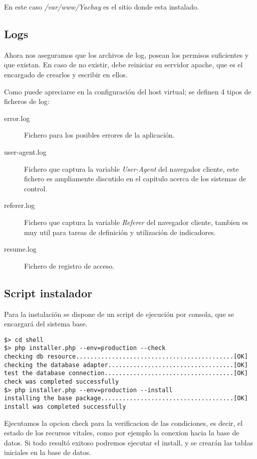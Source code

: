 En este caso \emph{/var/www/Yachay} es el sitio donde esta instalado.

\subsection{Logs}
Ahora nos aseguramos que los archivos de log, posean los permisos suficientes y que existan. En caso de no existir, debe
reiniciar su servidor apache, que es el encargado de crearlos y escribir en ellos.

Como puede apreciarse en la configuración del host virtual; se definen 4 tipos de ficheros de log:
\begin{description}
\item [error.log] Fichero para los posibles errores de la aplicación.
\item [user-agent.log] Fichero que captura la variable \emph{User-Agent} del navegador cliente, este fichero es ampliamente discutido en el capitulo acerca de los sistemas de control.
\item [referer.log] Fichero que captura la variable \emph{Referer} del navegador cliente, tambien es muy util para tareas
de definición y utilización de indicadores.
\item [resume.log] Fichero de registro de acceso.
\end{description}

\subsection{Script instalador}
Para la instalación se dispone de un script de ejecución por consola, que se encargará del sistema base.

\small
\begin{verbatim}
$> cd shell
$> php installer.php --env=production --check
checking db resource............................................[OK]
checking the database adapter...................................[OK]
test the database connection....................................[OK]
check was completed successfully
$> php installer.php --env=production --install
installing the base package.....................................[OK]
install was completed successfully
\end{verbatim}

Ejecutamos la opcion check para la verificacion de las condiciones, es decir, el estado de los recursos vitales, como
por ejemplo la conexion hacia la base de datos.
Si todo resultó exitoso podremos ejecutar el install, y se crearán las tablas iniciales en la base de datos.

